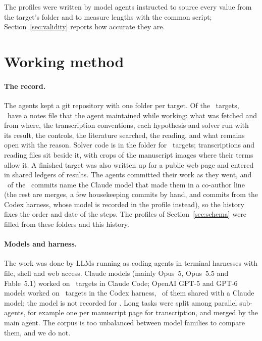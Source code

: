 \documentclass[11pt]{article}
\begin{document}
The profiles were written by model agents instructed to source every value from the target's folder and to measure lengths with the common script; Section~\ref{sec:validity} reports how accurate they are.

\section{Working method}
\label{sec:method}

\paragraph{The record.} The agents kept a git repository with one folder per target. Of the \Ntargets\ targets, \Nnotes\ have a notes file that the agent maintained while working: what was fetched and from where, the transcription conventions, each hypothesis and solver run with its result, the controls, the literature searched, the reading, and what remains open with the reason. Solver code is in the folder for \Ncode\ targets; transcriptions and reading files sit beside it, with crops of the manuscript images where their terms allow it. A finished target was also written up for a public web page and entered in shared ledgers of results. The agents committed their work as they went, and \Ncommitsmodel\ of the \Ncommits\ commits name the Claude model that made them in a co-author line (the rest are merges, a few housekeeping commits by hand, and commits from the Codex harness, whose model is recorded in the profile instead), so the history fixes the order and date of the steps. The profiles of Section~\ref{sec:schema} were filled from these folders and this history.

\paragraph{Models and harness.} The work was done by LLMs running as coding agents in terminal harnesses with file, shell and web access. Claude models (mainly Opus~5, Opus~5.5 and Fable~5.1) worked on \Nclaude\ targets in Claude Code; OpenAI GPT-5 and GPT-6 models worked on \Ngpt\ targets in the Codex harness, \Nboth\ of them shared with a Claude model; the model is not recorded for \Nmodelunknown. Long tasks were split among parallel sub-agents, for example one per manuscript page for transcription, and merged by the main agent. The corpus is too unbalanced between model families to compare them, and we do not.
\end{document}
